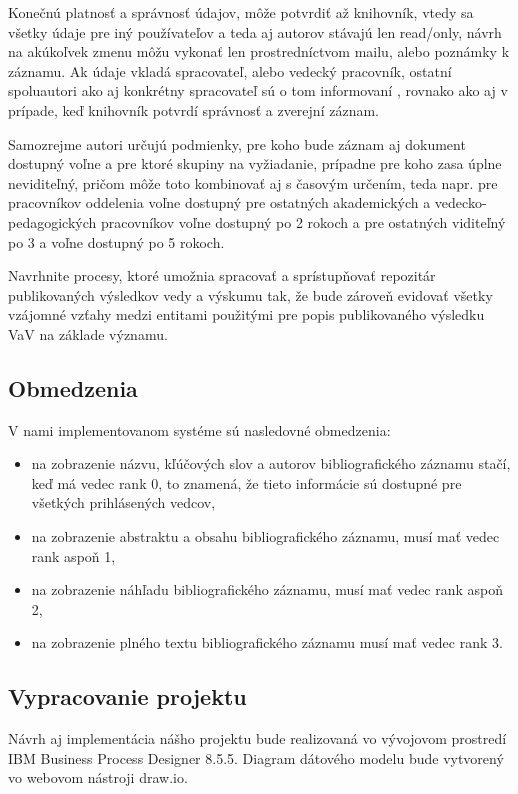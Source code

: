 \documentclass[10pt,oneside,slovak,a4paper]{article}
\begin{document}
Konečnú platnosť a správnosť údajov, môže potvrdiť až knihovník, vtedy sa všetky údaje pre iný používateľov a teda aj autorov stávajú len read/only, návrh na akúkoľvek zmenu môžu vykonať len prostredníctvom mailu, alebo poznámky k záznamu. Ak údaje vkladá spracovateľ, alebo vedecký pracovník, ostatní spoluautori ako aj konkrétny spracovateľ sú o tom informovaní , rovnako ako aj v prípade, keď knihovník potvrdí správnosť a zverejní záznam. 

Samozrejme autori určujú podmienky, pre koho bude záznam aj dokument dostupný voľne a pre ktoré skupiny na vyžiadanie, prípadne pre koho zasa úplne neviditeľný, pričom môže toto kombinovať aj s časovým určením, teda napr. pre pracovníkov oddelenia voľne dostupný pre ostatných akademických a vedecko-pedagogických pracovníkov voľne dostupný po 2 rokoch a pre ostatných viditeľný po 3 a voľne dostupný po 5 rokoch.

Navrhnite procesy, ktoré umožnia spracovať a sprístupňovať repozitár publikovaných výsledkov vedy a výskumu tak, že bude zároveň evidovať všetky vzájomné vzťahy medzi entitami použitými pre popis publikovaného výsledku VaV na základe významu.

\newpage

\subsection{Obmedzenia}
V nami implementovanom systéme sú nasledovné obmedzenia:
\begin{itemize}
\item na zobrazenie názvu, kľúčových slov a autorov bibliografického záznamu stačí, keď má vedec rank 0, to znamená, že tieto informácie sú dostupné pre všetkých prihlásených vedcov,
\item na zobrazenie abstraktu a obsahu bibliografického záznamu, musí mať vedec rank aspoň 1,
\item na zobrazenie náhľadu bibliografického záznamu, musí mať vedec rank aspoň 2,
\item na zobrazenie plného textu bibliografického záznamu musí mať vedec rank 3.
\end{itemize}

\subsection{Vypracovanie projektu}
Návrh aj implementácia nášho projektu bude realizovaná vo vývojovom prostredí IBM Business Process Designer 8.5.5. Diagram dátového modelu bude vytvorený vo webovom nástroji draw.io.
\end{document}
